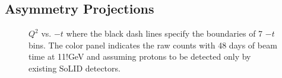 \subsection{Asymmetry Projections}

\begin{figure}[!ht]
 \begin{center}
   \caption[$Q^{2}$ vs. $-t$]{\footnotesize{$Q^{2}$ vs. $-t$ where the black
       dash lines specify the boundaries of 7 $-t$ bins. The color panel
       indicates the raw counts with 48 days of beam time at 11!GeV and
       assuming protons to be detected only by existing SoLID detectors.}}
  \label{Q2_t_bin}
  \end{center}
\end{figure}

